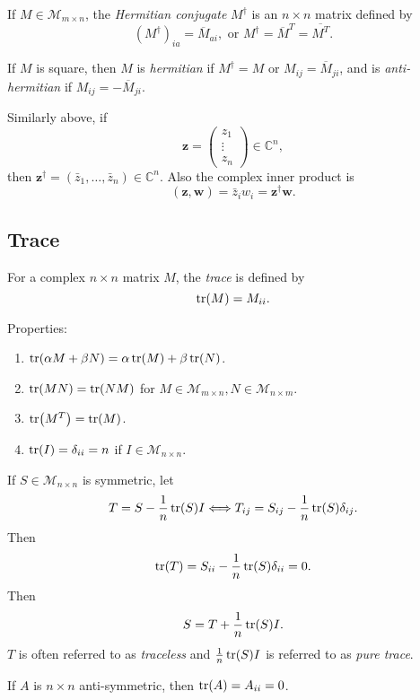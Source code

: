 \documentclass[10pt]{article}
\begin{document}
    \begin{definition}
        If $ M\in \mathcal{M}_{m\times n} $, the \textit{Hermitian conjugate} $ M^\dagger  $ is an $n\times n$ matrix defined by 
        \[
            (M^\dagger )_{ia}=\overline{M}_{ai}, \text{ or } M^\dagger =\overline{M}^T=\overline{M^T}
        .\]

        If $M$ is square, then $M$ is \textit{hermitian} if $ M^\dagger =M $ or $ M_{ij}=\overline{M}_{ji} $, and is \textit{anti-hermitian} if $ M_{ij}=-\overline{M}_{ji} $.
    \end{definition}
    Similarly above, if 
    \[
        \mathbf{z}=\begin{pmatrix}
            z_1\\\vdots\\z_n
        \end{pmatrix}\in \mathbb{C}^{n},
    \]
    then $ \mathbf{z}^\dagger = (\bar{z}_1,\dots, \bar{z}_n)\in \mathbb{C}^{n} $. Also the complex inner product is
    \[
        (\mathbf{z},\mathbf{w})=\bar{z}_i w_i=\mathbf{z}^\dagger \mathbf{w}
    .\]
    \subsection{Trace}
    \begin{definition}
        For a complex $ n \times n $ matrix $M$, the \textit{trace} is defined by 
        \[
            \trace(M)=M_{ii}
        .\]
    \end{definition}
    Properties:
    \begin{enumerate}
        \item $ \tr(\alpha M+ \beta N)=\alpha \tr(M)+\beta \tr(N) $.
        \item $ \tr(MN)=\tr(NM) $ for $ M\in \mathcal{M}_{m\times n}, N\in \mathcal{M}_{n\times m} $.
        \item $ \tr(M^T)=\tr(M) $.
        \item $ \tr(I)=\delta_{ii}=n $ if $ I\in \mathcal{M}_{n\times n} $.
    \end{enumerate}
    If $ S\in \mathcal{M}_{n\times n} $ is symmetric, let 
    \[
        T=S-\frac{1}{n}\tr(S)I \Longleftrightarrow T_{ij}=S_{ij}-\frac{1}{n}\tr(S)\delta_{ij}
    .\]
    Then
    \[
        \tr(T)=S_{ii}-\frac{1}{n}\tr(S)\delta_{ii}=0
    .\]
    Then 
    \[
        S=T+\frac{1}{n}\tr(S)I
    .\]
    $T$ is often referred to as \textit{traceless} and $ \frac{1}{n}\tr(S)I $ is referred to as \textit{pure trace}.
    \begin{remark}
        If $A$ is $ n \times n $ anti-symmetric, then $ \tr(A)=A_{ii}=0 $.
    \end{remark}
\end{document}
